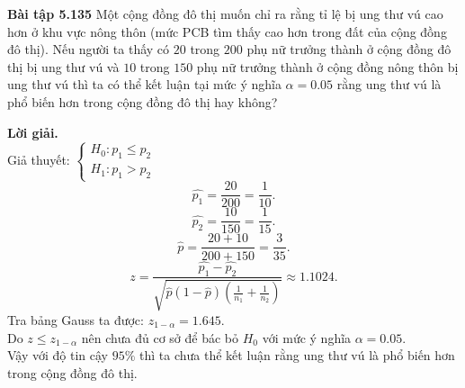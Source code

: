 \begin{mybox}
\textbf{Bài tập 5.135} Một cộng đồng đô thị muốn chỉ ra rằng tỉ lệ bị ung thư vú cao hơn ở khu vực nông thôn (mức PCB tìm thấy cao hơn trong đất của cộng đồng đô thị). Nếu người ta thấy có $20$ trong $200$ phụ nữ trưởng thành ở cộng đồng đô thị bị ung thư vú và $10$ trong $150$ phụ nữ trưởng thành ở cộng đồng nông thôn bị ung thư vú thì ta có thể kết luận tại mức ý nghĩa $\alpha = 0.05$ rằng ung thư vú là phổ biến hơn trong cộng đồng đô thị hay không?
\end{mybox}
\textbf{Lời giải.}\\
Giả thuyết: $\begin{cases}
H_0: p_1 \leqslant p_2\\
H_1: p_1 > p_2
\end{cases}$\\
$$\widehat{p_1} = \frac{20}{200} = \frac{1}{10}.$$
$$\widehat{p_2} = \frac{10}{150} = \frac{1}{15}.$$
$$\widehat{p} = \frac{20 + 10}{200 + 150} = \frac{3}{35}.$$
$$z = \frac{{\widehat {{p_1}} - \widehat {{p_2}}}}{{\sqrt {\widehat p\left( {1 - \widehat p} \right)\left( {\frac{1}{{{n_1}}} + \frac{1}{{{n_2}}}} \right)} }} \approx 1.1024.$$
Tra bảng Gauss ta được: $z_{1 - \alpha} = 1.645.$\\
Do $z \leqslant z_{1 - \alpha}$ nên chưa đủ cơ sở để bác bỏ $H_0$ với mức ý nghĩa $\alpha = 0.05.$\\
Vậy với độ tin cậy $95\%$ thì ta chưa thể kết luận rằng ung thư vú là phổ biến hơn trong cộng đồng đô thị.
